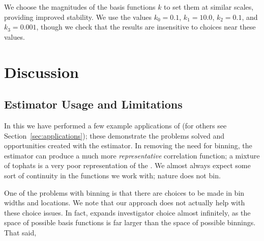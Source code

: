 We choose the magnitudes of the basis functions $k$ to set them at similar scales, providing improved stability.
We use the values $k_0=0.1$, $k_1=10.0$, $k_2=0.1$, and $k_3=0.001$, though we check that the results are insensitive to choices near these values.




\section{Discussion} \label{sec:discuss}

\subsection{Estimator Usage and Limitations}

In this \documentname we have performed a few example applications of \est (for others see Section~\ref{sec:applications}); these demonstrate the problems solved and opportunities created with the estimator.
In removing the need for binning, the estimator can produce a much more \textit{representative} correlation function; a mixture of tophats is a very poor representation of the \cf. 
We almost always expect some sort of continuity in the functions we work with; nature does not bin.

One of the problems with binning is that there are choices to be made in bin widths and locations.
We note that our approach does not actually help with these choice issues.
In fact, \est expands investigator choice almost infinitely, as the space of possible basis functions is far larger than the space of possible binnings.
That said, 

